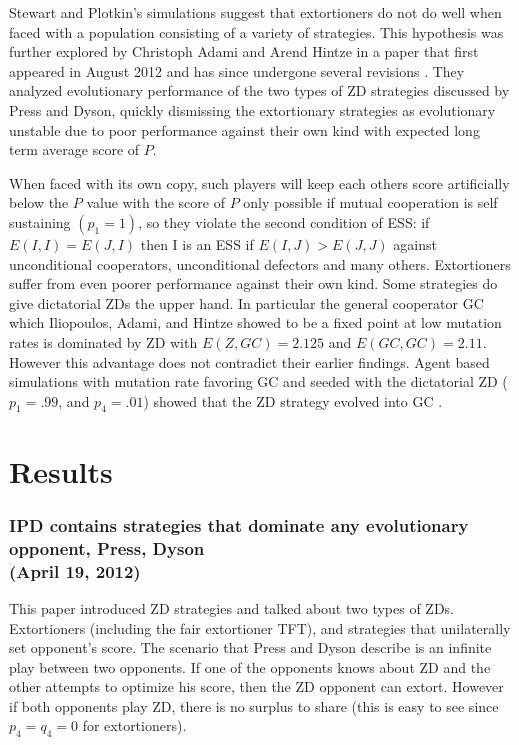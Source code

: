 Stewart and Plotkin's simulations suggest that extortioners do not do well when faced with a population consisting of a variety of strategies. This hypothesis was further explored by Christoph Adami and Arend Hintze in a paper that first appeared in August 2012 and has since undergone several revisions \cite{Adami_Hintze_2014}. They analyzed evolutionary performance of the two types of ZD strategies discussed by Press and Dyson, quickly dismissing the extortionary strategies as evolutionary unstable due to poor performance against their own kind with expected long term average score of $P$.

 When faced with its own copy, such players will keep each others score artificially below the $P$ value with the score of $P$ only possible if mutual cooperation is self sustaining $(p_1 = 1)$, so they violate the second condition of ESS: if $E(I, I) = E(J, I)$ then I is an ESS if $E(I, J) > E(J, J)$ against unconditional cooperators, unconditional defectors and many others. Extortioners suffer from even poorer performance against their own kind.
Some strategies do give dictatorial ZDs the upper hand. In particular the general cooperator GC which Iliopoulos, Adami, and Hintze showed to be a fixed point at low mutation rates \cite{iliopoulos_2010} is dominated by ZD with $E(Z, GC) = 2.125$ and $E(GC, GC) = 2.11$. However this advantage does not contradict their earlier findings. Agent based simulations with mutation rate favoring GC and seeded with the dictatorial ZD ($p_1 = .99$, and $p_4 = .01$) showed that the ZD strategy evolved into GC \cite{Adami_Hintze_2014}.


\section{Results}

\subsubsection{IPD contains strategies that dominate any evolutionary opponent, Press, Dyson \cite{Press26062012}
\\(April 19, 2012)}
This paper introduced ZD strategies and talked about two types of ZDs. Extortioners (including the fair extortioner TFT), and strategies that unilaterally set opponent's score. The scenario that Press and Dyson describe is an infinite play between two opponents. If one of the opponents knows about ZD and the other attempts to optimize his score, then the ZD opponent can extort. However if both opponents play ZD, there is no surplus to share (this is easy to see since $p_4 = q_4 = 0$ for extortioners). 


